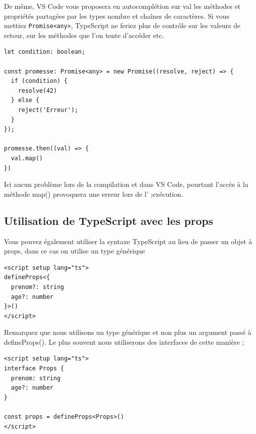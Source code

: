 De même, {\color{monOrange}VS Code} vous proposera en autocomplétion sur {\color{monOrange}val} les méthodes et propriétés partagées par les types nombre et chaînes de caractères. Si vous mettiez {\tt Promise<any>}, {\color{monOrange}TypeScript} ne feriez plus de contrôle sur les valeurs de retour, sur les méthodes que l'on tente d'accéder etc.
\begin{verbatim}
let condition: boolean;

const promesse: Promise<any> = new Promise((resolve, reject) => {
  if (condition) {
    resolve(42)
  } else {
    reject('Erreur');
  }
});

promesse.then((val) => {
  val.map()
})
\end{verbatim}
Ici aucun problème lors de la compilation et dans {\color{monOrange}VS Code}, pourtant l'accès à la méthode {\color{monOrange}map()} provoquera une erreur lors de l' ;exécution.

\subsection{Utilisation de {\color{monOrange}TypeScript} avec les {\color{monOrange}props}}
Vous pouvez également utiliser la syntaxe {\color{monOrange}TypeScript} au lieu de passer un objet à {\color{monOrange}props}, dans ce cas on utilise un type générique
\begin{verbatim}
<script setup lang="ts">
defineProps<{
  prenom?: string
  age?: number
}>()
</script>
\end{verbatim}
Remarquez que nous utilisons un type générique et non plus un argument passé à {\color{monOrange}defineProps()}. Le plus souvent nous utiliserons des {\color{monOrange}interfaces} de cette manière ;
\begin{verbatim}
<script setup lang="ts">
interface Props {
  prenom: string
  age?: number
}

const props = defineProps<Props>()
</script>
\end{verbatim}


